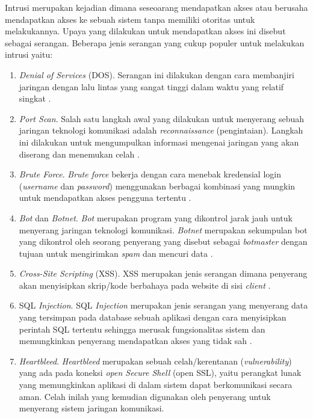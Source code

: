\documentclass[a4paper,12pt]{report}
\begin{document}
Intrusi merupakan kejadian dimana seseoarang mendapatkan akses atau berusaha mendapatkan akses ke sebuah sistem tanpa memiliki otoritas untuk melakukannya. Upaya yang dilakukan untuk mendapatkan akses ini disebut sebagai serangan. Beberapa jenis serangan yang cukup populer untuk melakukan intrusi yaitu:
\begin{enumerate}
	\item \textit{Denial of Services} (DOS). Serangan ini dilakukan dengan cara membanjiri jaringan dengan lalu lintas yang sangat tinggi dalam waktu yang relatif singkat \cite{hnamteDDoSAttackDetection2024}.
	
	\item \textit{Port Scan}. Salah satu langkah awal yang dilakukan untuk menyerang sebuah jaringan teknologi komunikasi adalah \textit{reconnaissance} (pengintaian). Langkah ini dilakukan untuk mengumpulkan informasi mengenai jaringan yang akan diserang dan menemukan celah \cite{hartpenceCombatingTCPPort2020}.
	
	\item \textit{Brute Force}. \textit{Brute force} bekerja dengan cara menebak kredensial login (\textit{username} dan \textit{password}) menggunakan berbagai kombinasi yang mungkin untuk mendapatkan akses pengguna tertentu \cite{groverEfficientBruteForce2020}. 
	
	\item \textit{Bot} dan \textit{Botnet}. \textit{Bot} merupakan program yang dikontrol jarak jauh untuk menyerang jaringan teknologi komunikasi. \textit{Botnet} merupakan sekumpulan bot yang dikontrol oleh seorang penyerang yang disebut sebagai \textit{botmaster} dengan tujuan untuk mengirimkan \textit{spam} dan mencuri data \cite{qureshiBotnetAttacksCharacteristics2023}.
	
	\item \textit{Cross-Site Scripting} (XSS). XSS merupakan jenis serangan dimana penyerang akan menyisipkan skrip/kode berbahaya pada website di sisi \textit{client} \cite{weamieCrossSiteScriptingAttacks2022}.
	
	\item SQL \textit{Injection}. SQL \textit{Injection} merupakan jenis serangan yang menyerang data yang tersimpan pada database sebuah aplikasi dengan cara menyisipkan perintah SQL tertentu sehingga merusak fungsionalitas sistem dan memungkinkan penyerang mendapatkan akses yang tidak sah \cite{paulSQLInjectionAttack2024}\cite{owaspSQLInjection}.
	
	\item \textit{Heartbleed}. \textit{Heartbleed} merupakan sebuah celah/kerentanan (\textit{vulnerability}) yang ada pada koneksi \textit{open Secure Shell} (open SSL), yaitu perangkat lunak yang memungkinkan aplikasi di dalam sistem dapat berkomunikasi secara aman. Celah inilah yang kemudian digunakan oleh penyerang untuk menyerang sistem jaringan komunikasi.
\end{enumerate}
\end{document}
